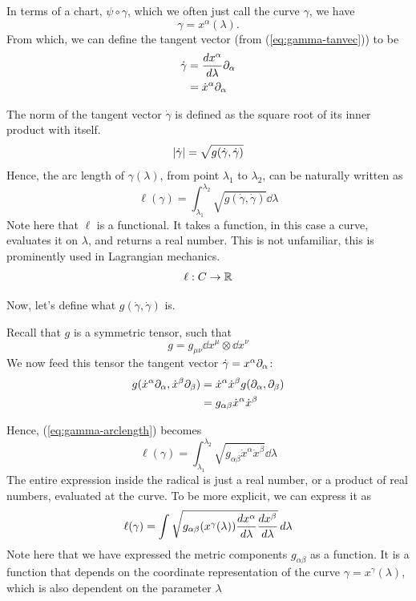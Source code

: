	In terms of a chart, $\psi\circ\gamma$, which we often just call the curve $\gamma$, we have
	\[
		\gamma = x^\alpha(\lambda).
	\]
	From which, we can define the tangent vector (from (\ref{eq:gamma-tanvec})) to be
	\begin{align*}
		\dot\gamma &= \dv{x^\alpha}{\lambda}\partial_\alpha \\
				   &= \dot x^\alpha \partial_\alpha
	\end{align*}

	The norm of the tangent vector $\dot \gamma$ is defined as the square root of its inner product with itself.
	\[
		\abs{\dot \gamma} = \sqrt{g(\dot\gamma,\dot\gamma)}
	\]
	Hence, the arc length of $\gamma(\lambda)$,
	from point $\lambda_1$ to $\lambda_2$, 
	can be naturally written as
	\begin{equation}
		\label{eq:gamma-arclength}
		\ell(\gamma) = \int_{\lambda_1}^{\lambda_2} \sqrt{
			g(\dot\gamma,\dot\gamma)
		}
		\dd{\lambda}
	\end{equation}
	Note here that $\ell$ is a functional. It takes a function, in this case a
	curve, evaluates it on $\lambda$, and returns a 
	real number. This is not unfamiliar, this is prominently used in Lagrangian mechanics.
	\[
		\ell : C\to \mathbb{R}
	\]

	Now, let's define what $g(\dot\gamma,\dot\gamma)$ is.

	Recall that $g$ is a symmetric tensor, such that
	\[
		g = g_{\mu\nu}\dd{x^\mu}\otimes\dd{x^\nu}
	\]
	We now feed this tensor the tangent vector $\dot\gamma = x^\alpha\partial_\alpha$:
	\begin{align*}
		g(
			\dot{x}^\alpha\partial_\alpha,
			\dot{x}^\beta\partial_\beta
		)
		&=
		\dot{x}^\alpha
		\dot{x}^\beta
		g(\partial_\alpha,\partial_\beta)\\
		&= 
		g_{\alpha\beta} 
		\dot{x}^\alpha
		\dot{x}^\beta
	\end{align*}

	Hence, (\ref{eq:gamma-arclength}) becomes
	\[
		\ell(\gamma) = \int_{\lambda_1}^{\lambda_2} 
		\sqrt{
			g_{\alpha\beta} 
			\dot{x}^\alpha
			\dot{x}^\beta
		}
		\dd{\lambda}
	\]
	The entire expression inside the radical is just a real number, or a product of real numbers, evaluated at the curve.
	To be more explicit, we can express it as
	\begin{equation}
		\label{eq:gamma-total-arclength}
		\ell(\gamma) = \int
		\sqrt{
			g_{\alpha\beta}(x^\gamma(\lambda))
			\dv{x^\alpha}{\lambda} 
			\dv{x^\beta}{\lambda} 
		}
		\dd{\lambda}
	\end{equation}
	Note here that we have expressed the metric components $g_{\alpha\beta}$ as a function.
	It is a function that depends on the coordinate representation of the curve $\gamma=x^\gamma(\lambda)$,
	which is also dependent on the parameter $\lambda$

